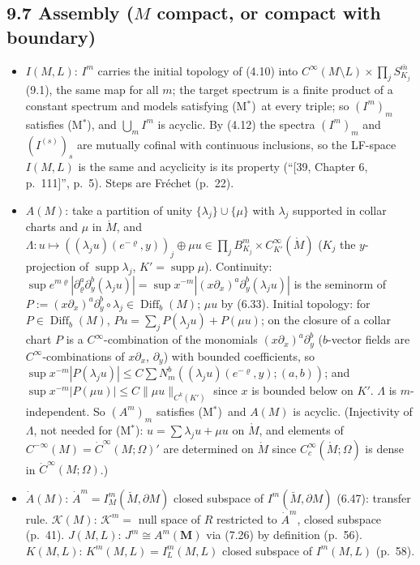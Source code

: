 \documentclass[11pt]{article}
\newcommand{\supp}{\operatorname{supp}}
\newcommand{\Diff}{\operatorname{Diff}}
\newcommand{\Mo}{\mathring{M}}
\newcommand{\Mb}{\breve{M}}
\newcommand{\MB}{\boldsymbol M}
\newcommand{\Mstar}{(M$^*$)}
\begin{document}
\subsection*{9.7 Assembly ($M$ compact, or compact with boundary)}
\begin{itemize}
\item $I(M,L)$: $I^m$ carries the initial topology of (4.10) into $C^\infty(M\setminus L)\times\prod_jS^{\bar m}_{K_j}$ (9.1), the same map for all $m$; the target spectrum is a finite product of a constant spectrum and models satisfying \Mstar\ at every triple; so $(I^m)_m$ satisfies \Mstar, and $\bigcup_mI^m$ is acyclic. By (4.12) the spectra $(I^m)_m$ and $(I^{(s)})_s$ are mutually cofinal with continuous inclusions, so the LF-space $I(M,L)$ is the same and acyclicity is its property (``[39, Chapter 6, p.~111]'', p.~5). Steps are Fr\'echet (p.~22).
\item $A(M)$: take a partition of unity $\{\lambda_j\}\cup\{\mu\}$ with $\lambda_j$ supported in collar charts and $\mu$ in $\Mo$, and $\Lambda\colon u\mapsto((\lambda_ju)(e^{-\varrho},y))_j\oplus\mu u\in\prod_jB^m_{K_j}\times C^\infty_{K'}(\Mo)$ ($K_j$ the $y$-projection of $\supp\lambda_j$, $K'=\supp\mu$). Continuity: $\sup e^{m\varrho}|\partial^a_\varrho\partial^b_y(\lambda_ju)|=\sup x^{-m}|(x\partial_x)^a\partial_y^b(\lambda_ju)|$ is the seminorm of $P:=(x\partial_x)^a\partial_y^b\circ\lambda_j\in\Diff_b(M)$; $\mu u$ by (6.33). Initial topology: for $P\in\Diff_b(M)$, $Pu=\sum_jP(\lambda_ju)+P(\mu u)$; on the closure of a collar chart $P$ is a $C^\infty$-combination of the monomials $(x\partial_x)^a\partial_y^b$ ($b$-vector fields are $C^\infty$-combinations of $x\partial_x$, $\partial_y$) with bounded coefficients, so $\sup x^{-m}|P(\lambda_ju)|\le C\sum N^b_m((\lambda_ju)(e^{-\varrho},y);(a,b))$; and $\sup x^{-m}|P(\mu u)|\le C\|\mu u\|_{C^k(K')}$ since $x$ is bounded below on $K'$. $\Lambda$ is $m$-independent. So $(A^m)_m$ satisfies \Mstar\ and $A(M)$ is acyclic. (Injectivity of $\Lambda$, not needed for \Mstar: $u=\sum\lambda_ju+\mu u$ on $\Mo$, and elements of $C^{-\infty}(M)=\dot C^\infty(M;\Omega)'$ are determined on $\Mo$ since $C_c^\infty(\Mo;\Omega)$ is dense in $\dot C^\infty(M;\Omega)$.)
\item $\dot A(M)$: $\dot A^m=I^m_M(\Mb,\partial M)$ closed subspace of $I^m(\Mb,\partial M)$ (6.47): transfer rule. $\mathcal K(M)$: $\mathcal K^m=$ null space of $R$ restricted to $\dot A^m$, closed subspace (p.~41). $J(M,L)$: $J^m\cong A^m(\MB)$ via (7.26) by definition (p.~56). $K(M,L)$: $K^m(M,L)=I^m_L(M,L)$ closed subspace of $I^m(M,L)$ (p.~58).

\end{itemize}
\end{document}
